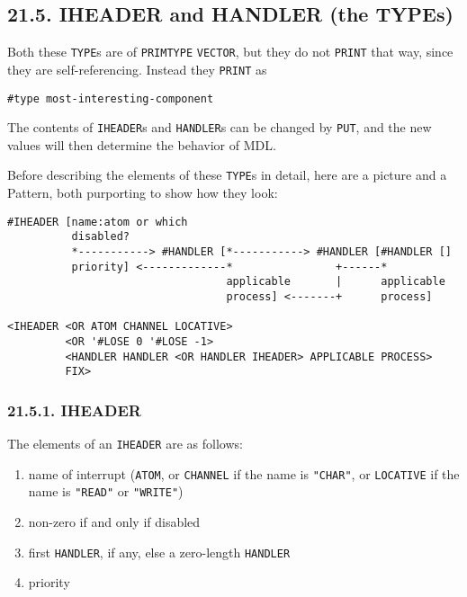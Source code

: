 \documentclass[a4paper,]{article}
\providecommand{\tightlist}{%
  \setlength{\itemsep}{0pt}\setlength{\parskip}{0pt}}
\begin{document}
\subsection{21.5. IHEADER and HANDLER (the TYPEs)}\label{iheader-and-handler-the-types}

Both these \texttt{TYPE}s are of \texttt{PRIMTYPE} \texttt{VECTOR}, but they do not \texttt{PRINT} that way, since they are
self-referencing. Instead they \texttt{PRINT} as

\begin{verbatim}
#type most-interesting-component
\end{verbatim}

The contents of \texttt{IHEADER}s and \texttt{HANDLER}s can
be changed by \texttt{PUT}, and the new values will then determine the behavior of MDL.

Before describing the elements of these \texttt{TYPE}s in detail, here are a picture and a Pattern, both purporting to show
how they look:

\begin{verbatim}
#IHEADER [name:atom or which
          disabled?
          *-----------> #HANDLER [*-----------> #HANDLER [#HANDLER []
          priority] <-------------*                +------*
                                  applicable       |      applicable
                                  process] <-------+      process]

<IHEADER <OR ATOM CHANNEL LOCATIVE>
         <OR '#LOSE 0 '#LOSE -1>
         <HANDLER HANDLER <OR HANDLER IHEADER> APPLICABLE PROCESS>
         FIX>
\end{verbatim}

\subsubsection{21.5.1. IHEADER}\label{iheader}

The elements of an \texttt{IHEADER} are as follows:

\begin{enumerate}
\def\labelenumi{\arabic{enumi}.}
\tightlist
\item
  name of interrupt (\texttt{ATOM}, or \texttt{CHANNEL} if the name is \texttt{"CHAR"}, or \texttt{LOCATIVE} if the name is
  \texttt{"READ"} or \texttt{"WRITE"})
\item
  non-zero if and only if disabled
\item
  first \texttt{HANDLER}, if any, else a zero-length \texttt{HANDLER}
\item
  priority
\end{enumerate}
\end{document}
